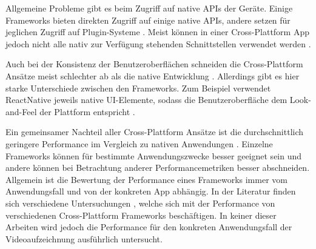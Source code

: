 Allgemeine Probleme gibt es beim Zugriff auf native \acp{API} der Geräte.
Einige Frameworks bieten direkten Zugriff auf einige native \acp{API}, andere setzen für jeglichen Zugriff auf Plugin-Systeme \cite{Heitkoetter_CrossPlatform_Comparison, Sasidaran_Survey_NativeHybrid}.
Meist können in einer Cross-Plattform App jedoch nicht alle nativ zur Verfügung stehenden Schnittstellen verwendet werden \cite{Pinto_Native_to_Cross_Platform}.

Auch bei der Konsistenz der Benutzeroberflächen schneiden die Cross-Plattform Ansätze meist schlechter ab als die native Entwicklung \cite{Manchanda_CrossPlatformFrameworks}.
Allerdings gibt es hier starke Unterschiede zwischen den Frameworks. 
Zum Beispiel verwendet ReactNative jeweils native \ac{UI}-Elemente, sodass die Benutzeroberfläche dem Look-and-Feel der Plattform entspricht \cite{React_NativeComponents}.

Ein gemeinsamer Nachteil aller Cross-Plattform Ansätze ist die durchschnittlich geringere Performance im Vergleich zu nativen Anwendungen \cite{Que_Comparison_Hybrid_Native, Pinto_Native_to_Cross_Platform}.
Einzelne Frameworks können für bestimmte Anwendungszwecke besser geeignet sein und andere können bei Betrachtung anderer Performancemetriken besser abschneiden.
Allgemein ist die Bewertung der Performance eines Frameworks immer vom Anwendungsfall und von der konkreten App abhängig.
In der Literatur finden sich verschiedene Untersuchungen \cite{Nawrocki_Comparison_Hybrid_Native_Frameworks,Biorn-Hansen_PerformanceOverhead_CrossPlatform,Jia_Performance}, welche sich mit der Performance von verschiedenen Cross-Plattform Frameworks beschäftigen. 
In keiner dieser Arbeiten wird jedoch die Performance für den konkreten Anwendungsfall der Videoaufzeichnung ausführlich untersucht.